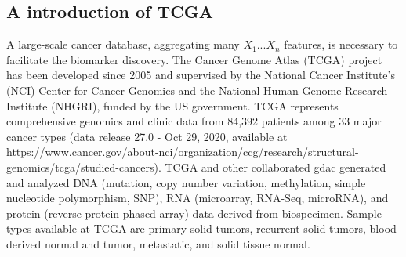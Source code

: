 \documentclass[jpm,article,submit,moreauthors,pdftex]{Definitions/mdpi}
\newenvironment{MyColorPar}[1]{%
    \leavevmode\color{#1}\ignorespaces%
}{%
}%
\begin{document}
\subsection{A introduction of TCGA}
A large-scale cancer database, aggregating many $X_1 ... X_n$ features, is necessary to facilitate the biomarker discovery.
The Cancer Genome Atlas (TCGA) project\cite{Weinstein2013} has been developed since 2005 and supervised by the National Cancer Institute's (NCI) Center for Cancer Genomics and the National Human Genome Research Institute (NHGRI), funded by the US government.
TCGA represents comprehensive genomics and clinic data from 84,392 patients among 33 major cancer types (data release 27.0 - Oct 29, 2020, available at https://www.cancer.gov/about-nci/organization/ccg/research/structural-genomics/tcga/studied-cancers).
TCGA and other collaborated \acrfull{gdac} generated and analyzed DNA (mutation, copy number variation, methylation, simple nucleotide polymorphism, SNP), RNA (microarray, RNA-Seq, microRNA), and protein (reverse protein phased array) data derived from biospecimen. Sample types available at TCGA are primary solid tumors, recurrent solid tumors, blood-derived normal and tumor, metastatic, and solid tissue normal.  
\end{document}
